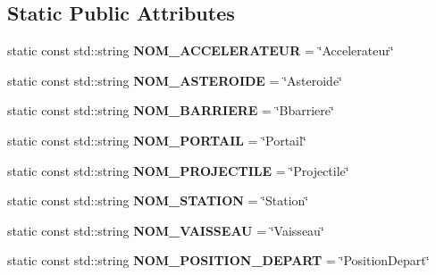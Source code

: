 \subsection*{Static Public Attributes}
\begin{DoxyCompactItemize}
\item 
\hypertarget{group__inf2990_ga445635db2cf91ecb46d96346f886100e}{static const std\-::string {\bfseries N\-O\-M\-\_\-\-A\-C\-C\-E\-L\-E\-R\-A\-T\-E\-U\-R} = \char`\"{}Accelerateur\char`\"{}}\label{group__inf2990_ga445635db2cf91ecb46d96346f886100e}

\item 
\hypertarget{group__inf2990_gade5f55af8001f09e007aac6a010c3002}{static const std\-::string {\bfseries N\-O\-M\-\_\-\-A\-S\-T\-E\-R\-O\-I\-D\-E} = \char`\"{}Asteroide\char`\"{}}\label{group__inf2990_gade5f55af8001f09e007aac6a010c3002}

\item 
\hypertarget{group__inf2990_gad41eac1b0b90d38de6c22a1a6547b1da}{static const std\-::string {\bfseries N\-O\-M\-\_\-\-B\-A\-R\-R\-I\-E\-R\-E} = \char`\"{}Bbarriere\char`\"{}}\label{group__inf2990_gad41eac1b0b90d38de6c22a1a6547b1da}

\item 
\hypertarget{group__inf2990_ga71a649e3d19417d31752a25c002dc4d6}{static const std\-::string {\bfseries N\-O\-M\-\_\-\-P\-O\-R\-T\-A\-I\-L} = \char`\"{}Portail\char`\"{}}\label{group__inf2990_ga71a649e3d19417d31752a25c002dc4d6}

\item 
\hypertarget{group__inf2990_ga81ea9b807a272a338c5be22bde0b6c65}{static const std\-::string {\bfseries N\-O\-M\-\_\-\-P\-R\-O\-J\-E\-C\-T\-I\-L\-E} = \char`\"{}Projectile\char`\"{}}\label{group__inf2990_ga81ea9b807a272a338c5be22bde0b6c65}

\item 
\hypertarget{group__inf2990_ga883f40a096fda37a70e165f7482946de}{static const std\-::string {\bfseries N\-O\-M\-\_\-\-S\-T\-A\-T\-I\-O\-N} = \char`\"{}Station\char`\"{}}\label{group__inf2990_ga883f40a096fda37a70e165f7482946de}

\item 
\hypertarget{group__inf2990_gaebd1eba0f3fb0438336bf104ab066f8e}{static const std\-::string {\bfseries N\-O\-M\-\_\-\-V\-A\-I\-S\-S\-E\-A\-U} = \char`\"{}Vaisseau\char`\"{}}\label{group__inf2990_gaebd1eba0f3fb0438336bf104ab066f8e}

\item 
\hypertarget{group__inf2990_ga54efa483c652cb200fe18763b67cf0aa}{static const std\-::string {\bfseries N\-O\-M\-\_\-\-P\-O\-S\-I\-T\-I\-O\-N\-\_\-\-D\-E\-P\-A\-R\-T} = \char`\"{}Position\-Depart\char`\"{}}\label{group__inf2990_ga54efa483c652cb200fe18763b67cf0aa}

\end{DoxyCompactItemize}
